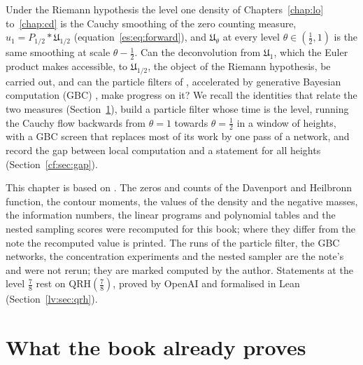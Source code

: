 \label{chap:cf}

Under the Riemann hypothesis the level one density of Chapters~\ref{chap:lo} to~\ref{chap:cd} is the Cauchy smoothing of the zero counting measure, $u_1=P_{1/2}*\mathfrak U_{1/2}$ (equation~\eqref{es:eq:forward}), and $\mathfrak U_\theta$ at every level $\theta\in(\frac12,1)$ is the same smoothing at scale $\theta-\frac12$. Can the deconvolution from $\mathfrak U_1$, which the Euler product makes accessible, to $\mathfrak U_{1/2}$, the object of the Riemann hypothesis, be carried out, and can the particle filters of \cite{PSH626}, accelerated by generative Bayesian computation (GBC) \cite{PS23}, make progress on it? We recall the identities that relate the two measures (Section~\ref{cf:sec:recap}), build a particle filter whose time is the level, running the Cauchy flow backwards from $\theta=1$ towards $\theta=\frac12$ in a window of heights, with a GBC screen that replaces most of its work by one pass of a network, and record the gap between local computation and a statement for all heights (Section~\ref{cf:sec:gap}).

This chapter is based on \cite{P26cf}. The zeros and counts of the Davenport and Heilbronn function, the contour moments, the values of the density and the negative masses, the information numbers, the linear programs and polynomial tables and the nested sampling scores were recomputed for this book; where they differ from the note the recomputed value is printed. The runs of the particle filter, the GBC networks, the concentration experiments and the nested sampler are the note's and were not rerun; they are marked computed by the author. Statements at the level $\frac78$ rest on $\mathrm{QRH}(\frac78)$, proved by OpenAI \cite{OAI26a} and formalised in Lean (Section~\ref{lv:sec:qrh}).

\section{What the book already proves}\label{cf:sec:recap}

